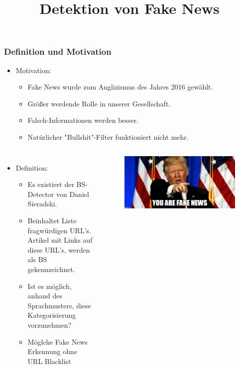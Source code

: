 \documentclass[aspectratio=1610, professionalfonts, 9pt]{beamer}
\title{Detektion von Fake News}
\author{%
  Lars Möllerherm \& \\ 
  \texorpdfstring{\and}{, }%
  Clemens Vorsmann%
}
\institute{Fakultät Physik}
\begin{document}
  \begin{frame}
    \titlepage
  \end{frame}

  \begin{frame}
    \frametitle{Definition und Motivation}
    \begin{itemize}
      \item Motivation:
      \begin{itemize}
        \item Fake News wurde zum Anglizismus des Jahres 2016 gewählt\cite{angli}.
        \item Größer werdende Rolle in unserer Gesellschaft.
        \item Falsch-Informationen werden besser.
        \item Natürlicher "Bullshit"-Filter funktioniert nicht mehr.
      \end{itemize}
    \end{itemize}
    \begin{columns}
      \begin{itemize}
        \item Definition:
        \begin{itemize}
        \item Es existiert der BS-Detector von Daniel Sieradski\cite{BS}.
        \item Beinhaltet Liste fragwürdigen URL's. Artikel mit Links auf diese URL's, 
            werden als BS gekennzeichnet.
        \item Ist es möglich, anhand des Sprachmusters, diese Kategorisierung vorzunehmen?
        \item Möglche Fake News Erkennung ohne URL Blacklist
        \end{itemize}
      \end{itemize}
      \begin{figure}
          \includegraphics[width=\textwidth]{pictures/trump-fake-news.jpg}
          \caption{\cite{trump}}
          \label{}
        \end{figure}
      \end{columns}
  \end{frame}
\end{document}
